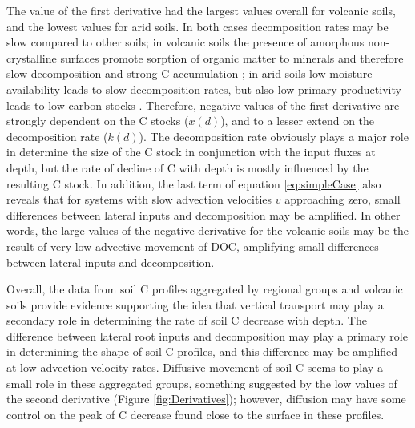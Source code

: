 \documentclass[11pt, oneside, a4paper]{article}   	%
\begin{document}
The value of the first derivative had the largest values overall for volcanic soils, and the lowest values for arid soils. In both cases decomposition rates may be slow compared to other soils; in volcanic soils the presence of amorphous non-crystalline surfaces promote sorption of organic matter to minerals and therefore slow decomposition and strong C accumulation \citep{Marin-Spiotta2011, Crow2015}; in arid soils low moisture availability leads to slow decomposition rates, but also low primary productivity leads to low carbon stocks \citep{Moyano2013, Sierra2015JAMES}. Therefore, negative values of the first derivative are strongly dependent on the C stocks ($x(d)$), and to a lesser extend on the decomposition rate ($k(d)$). The decomposition rate obviously plays a major role in determine the size of the C stock in conjunction with the input fluxes at depth, but the rate of decline of C with depth is mostly influenced by the resulting C stock. In addition, the last term of equation \ref{eq:simpleCase} also reveals that for systems with slow advection velocities $v$ approaching zero, small differences between lateral inputs and decomposition may be amplified. In other words, the large values of the negative derivative for the volcanic soils may be the result of very low advective movement of DOC, amplifying small differences between lateral inputs and decomposition.

Overall, the data from soil C profiles aggregated by regional groups and volcanic soils provide evidence supporting the idea that vertical transport may play a secondary role in determining the rate of soil C decrease with depth. The difference between lateral root inputs and decomposition may play a primary role in determining the shape of soil C profiles, and this difference may be amplified at low advection velocity rates. Diffusive movement of soil C seems to play a small role in these aggregated groups, something suggested by the low values of the second derivative (Figure \ref{fig:Derivatives}); however, diffusion may have some control on the peak of C decrease found close to the surface in these profiles. 
\end{document}
